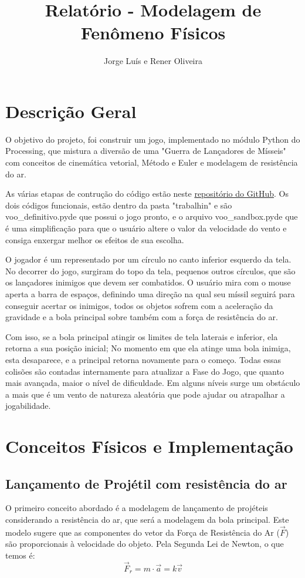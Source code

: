 \documentclass[12pt,letterpaper]{article}
\title{Relatório - Modelagem de Fenômeno Físicos}
\author{Jorge Luís e Rener Oliveira}
\begin{document}
\maketitle

\section*{Descrição Geral}

O objetivo do projeto, foi construir um jogo, implementado no módulo Python do Processing, que mistura a diversão de uma "Guerra de Lançadores de Mísseis" com conceitos de cinemática vetorial, Método e Euler e modelagem de resistência do ar.

As várias etapas de contrução do código estão neste  \href{https://github.com/jlfcosta/littlebeautythings}{repositório do GitHub}.
Os dois códigos funcionais, estão dentro da pasta "trabalhin" e são voo\_definitivo.pyde que possui o jogo pronto, e o arquivo voo\_sandbox.pyde que é uma simplificação para que o usuário altere o valor da velocidade do vento e consiga enxergar melhor os efeitos de sua escolha.


O jogador é um representado por um círculo no canto inferior esquerdo da tela. No decorrer do jogo, surgiram do topo da tela, pequenos outros círculos, que são os lançadores inimigos que devem ser combatidos. O usuário mira com o mouse aperta a barra de espaços, definindo uma direção na qual seu míssil seguirá para conseguir acertar os inimigos, todos os objetos sofrem com a aceleração da gravidade e a bola principal sobre também com a força de resistência do ar. 

Com isso, se a bola principal atingir os limites de tela laterais e inferior, ela retorna a sua posição inicial; No momento em que ela atinge uma bola inimiga, esta desaparece, e a principal retorna novamente para o começo. Todas essas colisões são contadas internamente para atualizar a Fase do Jogo, que quanto mais avançada, maior o nível de dificuldade. Em alguns níveis surge um obstáculo a mais que é um vento de natureza aleatória que pode ajudar ou atrapalhar a jogabilidade.

\section*{Conceitos Físicos e Implementação}
\subsection*{Lançamento de Projétil com resistência do ar}
O primeiro conceito abordado é a modelagem de lançamento de projéteis considerando a resistência do ar, que será a modelagem da bola principal. Este modelo sugere que as componentes do vetor da Força de Resistência do Ar ($\vec{F}$) são proporcionais à velocidade do objeto. Pela Segunda Lei de Newton, o que temos é:
$$\vec{F}_r=m\cdot\vec{a}=k\vec{v}$$
\end{document}
